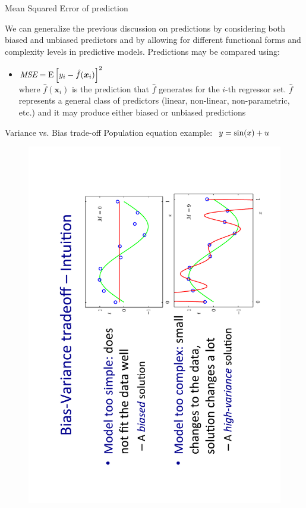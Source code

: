 \documentclass{beamer}
\begin{document}
\begin{frame}{Mean Squared Error of prediction}

We can generalize the previous discussion on predictions by considering both biased and unbiased predictors and by allowing for different functional forms and complexity levels in predictive models. Predictions may be compared using:

\medskip
\begin{itemize}
   \item $\textit{MSE} = \textnormal{E}
   \left[y_i - \hat{f}(\bm{x}_i) \right]^2$\\
   \smallskip
   where $\hat{f}(\bm{x}_i)$ is the prediction that $\hat{f}$ generates for the $i$-th regressor set. $\hat{f}$ represents a general class of predictors (linear, non-linear, non-parametric, etc.) and it may produce either biased or unbiased predictions
\end{itemize}
\end{frame}
\begin{frame}{Variance vs. Bias trade-off}
Population equation example: $~y = \textnormal{sin}(x)+u$
\vspace{-1cm}
\begin{figure}
\includegraphics[angle=270,scale=0.35]{img/VarBias.pdf}
\end{figure}
\end{frame}
\end{document}
